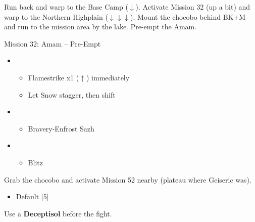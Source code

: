 Run back and warp to the Base Camp ($\downarrow$).
Activate Mission 32 (up a bit) and warp to the Northern Highplain ($\downarrow\downarrow\downarrow$).
Mount the chocobo behind BK+M and run to the mission area by the lake.
Pre-empt the Amam.

\begin{battle}{Mission 32: Amam -- Pre-Empt}
	\begin{itemize}
		\item \sixth
			\begin{itemize}
				\item Flamestrike x1 ($\uparrow$) immediately
				\item Let Snow stagger, then shift
			\end{itemize}
		\item \fourth
			\begin{itemize}
				\item Bravery-Enfrost Sazh
			\end{itemize}
		\item \first
			\begin{itemize}
				\item Blitz
			\end{itemize}
	\end{itemize}
\end{battle}

Grab the chocobo and activate Mission 52 nearby (plateau where Geiseric was).

\begin{menu}
	\begin{itemize}
	\paradigm
		\begin{itemize}
			\item Default [5]
		\end{itemize}
	\end{itemize}
\end{menu}

Use a \textbf{Deceptisol} before the fight.


